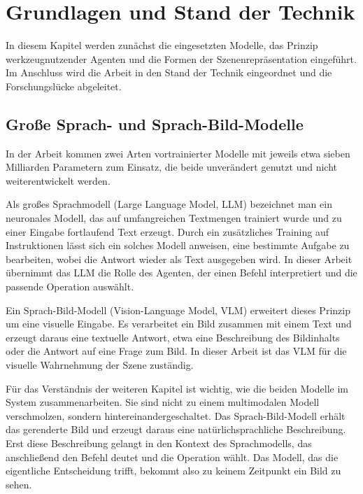 
\chapter{Grundlagen und Stand der Technik}
\label{ch:grundlagen}

In diesem Kapitel werden zunächst die eingesetzten Modelle, das Prinzip werkzeugnutzender Agenten und die Formen der Szenenrepräsentation eingeführt.
Im Anschluss wird die Arbeit in den Stand der Technik eingeordnet und die Forschungslücke abgeleitet.


\section{Große Sprach- und Sprach-Bild-Modelle}
\label{sec:grundlagen-modelle}

In der Arbeit kommen zwei Arten vortrainierter Modelle mit jeweils etwa sieben Milliarden Parametern zum Einsatz, die beide unverändert genutzt und nicht weiterentwickelt werden.

Als großes Sprachmodell (Large Language Model, LLM) bezeichnet man ein neuronales Modell, das auf umfangreichen Textmengen trainiert wurde und zu einer Eingabe fortlaufend Text erzeugt.
Durch ein zusätzliches Training auf Instruktionen lässt sich ein solches Modell anweisen, eine bestimmte Aufgabe zu bearbeiten, wobei die Antwort wieder als Text ausgegeben wird.
In dieser Arbeit übernimmt das LLM die Rolle des Agenten, der einen Befehl interpretiert und die passende Operation auswählt.

Ein Sprach-Bild-Modell (Vision-Language Model, VLM) erweitert dieses Prinzip um eine visuelle Eingabe.
Es verarbeitet ein Bild zusammen mit einem Text und erzeugt daraus eine textuelle Antwort, etwa eine Beschreibung des Bildinhalts oder die Antwort auf eine Frage zum Bild.
In dieser Arbeit ist das VLM für die visuelle Wahrnehmung der Szene zuständig.

Für das Verständnis der weiteren Kapitel ist wichtig, wie die beiden Modelle im System zusammenarbeiten.
Sie sind nicht zu einem multimodalen Modell verschmolzen, sondern hintereinandergeschaltet.
Das Sprach-Bild-Modell erhält das gerenderte Bild und erzeugt daraus eine natürlichsprachliche Beschreibung.
Erst diese Beschreibung gelangt in den Kontext des Sprachmodells, das anschließend den Befehl deutet und die Operation wählt.
Das Modell, das die eigentliche Entscheidung trifft, bekommt also zu keinem Zeitpunkt ein Bild zu sehen.

